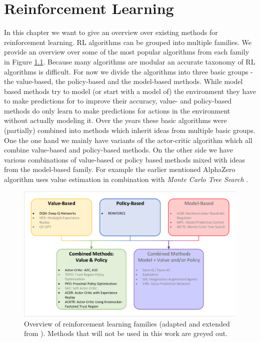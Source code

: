 \chapter{Reinforcement Learning} \label{chp: RLOverview}
In this chapter we want to give an overview over existing methods for reinforcement learning. RL algorithms can be grouped into multiple families. We provide an overview over some of the most popular algorithms from each family in Figure \ref{fig:rl_families}. Because many algorithms are modular an accurate taxonomy of RL algorithms is difficult. For now we divide the algorithms into three basic groups - the value-based, the policy-based and the model-based methods. While model based methods try to model (or start with a model of) the environment they have to make predictions for to improve their accuracy, value- and policy-based methods do only learn to make predictions for actions in the environment without actually modeling it.
Over the years these basic algorithms were (partially) combined into methods which inherit ideas from multiple basic groups. One the one hand we mainly have variants of the actor-critic algorithm which all combine value-based and policy-based methods. On the other side we have various combinations of value-based or policy based methods mixed with ideas from the model-based family. For example the earlier mentioned AlphaZero algorithm uses value estimation in combination with \textit{Monte Carlo Tree Search} \cite{silver2017mastering}. 

\begin{figure}[ht]
    
  \begin{center}
      \includegraphics[clip, trim=10px 10px 10px 10px, width=0.95\columnwidth]{figures/rl/rl_families.pdf}
  \end{center}
  
  \caption[Overview of RL Families]{Overview of reinforcement learning families (adapted and extended from \cite{foundations2019graesser}). Methods that will not be used in this work are greyed out.}
  \label{fig:rl_families}
\end{figure}


